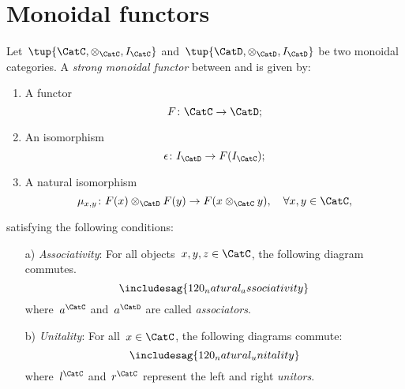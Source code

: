 \section{Monoidal functors}
\label{sec:monoidal-functors}
\begin{ctdefinition}
  \label{def:strong-monoidal-functor}

  Let~$\tup{\CatC,\otimes_\CatC,I_\CatC}$ and~$\tup{\CatD,\otimes_\CatD,I_\CatD}$ be two monoidal categories. A \emph{strong monoidal functor} between \CatC and \CatD is given by:
  \begin{enumerate}
    \item A functor
    \begin{equation}
      F\colon \CatC\to \CatD;
    \end{equation}
    \item An isomorphism
    \begin{equation}
      \epsilon\colon I_\CatD\to F(I_\CatC);
    \end{equation}
    \item A natural isomorphism
    \begin{equation}
      \mu_{x,y}\colon F(x)\otimes_\CatD F(y) \to F(x\otimes_\CatC y),\quad \forall x,y\in \CatC,
    \end{equation}
  \end{enumerate}
  satisfying the following conditions:
  \begin{enumerate}
    \item[a)] \emph{Associativity}: For all objects~$x,y,z\in \CatC$, the following diagram commutes.
    \begin{equation}
      \includesag{120_natural_associativity}
    \end{equation}
    where~$a^\CatC$ and~$a^\CatD$ are called \emph{associators}.
    \item[b)] \emph{Unitality}: For all~$x\in \CatC$, the following diagrams commute:
    \begin{equation}
      \includesag{120_natural_unitality}
    \end{equation}
    where~$l^\CatC$ and~$r^\CatC$ represent the left and right \emph{unitors}.
  \end{enumerate}
\end{ctdefinition}



